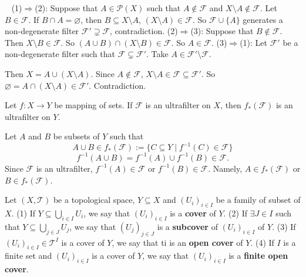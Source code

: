 \begin{proofenv}
    \ \newline
    (1)$\Rightarrow $(2): Suppose that $A\in \mathscr{P}(X)$ such that $A\notin \mathcal{F}$ and $X\setminus A\notin\mathcal{F}$. Let $B\in \mathcal{F}$. If $B\cap A=\varnothing$, then $B\subseteq X\setminus A$, $(X\setminus A)\in \mathcal{F}$. So $\mathcal{F}\cup\{A\}$ generates a non-degenerate filter $\mathcal{F}'\supsetneq\mathcal{F}$, contradiction.
    \newline
    (2)$\Rightarrow$(3): Suppose that $B\notin \mathcal{F}$. Then $X\setminus B\in \mathcal{F}$. So $\left(A\cup B\right)\cap \left(X\setminus B\right)\in \mathcal{F}$. So $A\in \mathcal{F}$.
    \newline
    (3)$\Rightarrow$(1): Let $\mathcal{F}'$ be a non-degenerate filter such that $\mathcal{F}\subsetneq\mathcal{F}'$. Take $A\in \mathcal{F}'\setminus \mathcal{F}$.

    Then $X=A\cup\left(X\setminus A\right)$. Since $A\notin\mathcal{F}$, $X\setminus A\in \mathcal{F}\subseteq \mathcal{F}'$. So $\varnothing=A\cap\left(X\setminus A\right)\in \mathcal{F}'$. Contradiction.
\end{proofenv}
\begin{corollaryenv}
    Let $f:X\longrightarrow Y$ be mapping of sets. If $\mathcal{F}$ is an ultrafilter on $X$, then $f_*(\mathcal{F})$ is an ultrafilter on $Y$.
\end{corollaryenv}
\begin{proofenv}
    Let $A$ and $B$ be subsets of $Y$ such that 
    $$A\cup B\in f_*(\mathcal{F}):=\{C\subseteq Y\mid f^{-1}(C)\in \mathcal{F}\}$$
    $$f^{-1}\left(A\cup B\right)=f^{-1}(A)\cup f^{-1}(B)\in \mathcal{F}.$$
    Since $\mathcal{F}$ is an ultrafilter, $f^{-1}(A)\in \mathcal{F}$ or $f^{-1}(B)\in \mathcal{F}$. Namely, $A\in f_*(\mathcal{F})$ or $B\in f_*(\mathcal{F})$.
\end{proofenv}
\begin{definitionenv}
    Let $(X,\mathscr{T})$ be a topological space, $Y\subseteq X$ and $\left(U_i\right)_{i\in I}$  be a family of subset of $X$.
    \newline
    (1) If $Y\subseteq\bigcup_{i\in I}U_i$, we say that $\left(U_i\right)_{i\in I}$ is a \textbf{cover} of $Y$.
    \newline
    (2) If $\exists J\in I$ such that $Y\subseteq \bigcup_{j\in J}U_j$, we say that $\left(U_j\right)_{j\in J}$ is a \textbf{subcover} of $\left(U_i\right)_{i\in I}$ of $Y$.
    \newline
    (3) If $\left(U_i\right)_{i\in I}\in \mathscr{T}^I$ is a cover of $Y$, we say that ti is an \textbf{open cover} of $Y$.
    \newline
    (4) If $I$ is a finite set and $\left(U_i\right)_{i\in I}$ is a cover of $Y$, we say that $\left(U_i\right)_{i\in I}$ is a \textbf{finite open cover}.
\end{definitionenv}
